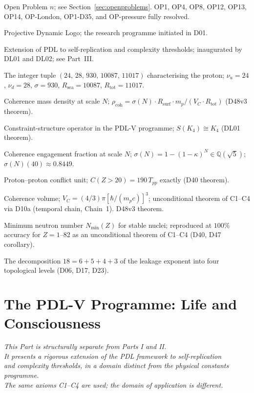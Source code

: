 \documentclass[11pt,a4paper]{article}
\theoremstyle{plain}
\theoremstyle{definition}
\theoremstyle{remark}
\newcommand{\quintuplet}{(24,\,28,\,930,\,10087,\,11017)}
\newcommand{\Rsurf}{R_{\mathrm{surf}}}
\newcommand{\Rtot}{R_{\mathrm{tot}}}
\newcommand{\sigmaN}{\sigma(N)}
\newcommand{\Tpp}{T_{pp}}
\newcommand{\rhocoh}{\rho_{\mathrm{coh}}}
\begin{document}
\begin{description}[leftmargin=3.5cm, style=nextline]
\item[OP$n$] Open Problem $n$; see Section~\ref{sec:openproblems}. OP1, OP4, OP8, OP12, OP13, OP14, OP-London, OP1-D35, and OP-pressure fully resolved.
\item[PDL] Projective Dynamic Logo; the research programme initiated in D01.
\item[PDL-V programme] Extension of PDL to self-replication and complexity thresholds; inaugurated by DL01 and DL02; see Part~III.
\item[Quintuplet] The integer tuple $\quintuplet$ characterising the proton; $\nu_u=24$, $\nu_d=28$, $\sigma=930$, $R_{\mathrm{sea}}=10087$, $R_{\mathrm{tot}}=11017$.
\item[$\rhocoh(N)$] Coherence mass density at scale $N$; $\rhocoh = \sigmaN\cdot\Rsurf\cdot m_p/(V_C\cdot\Rtot)$ (D48v3 theorem).
\item[$S(\Gamma)$] Constraint-structure operator in the PDL-V programme; $S(K_4) \cong K_4$ (DL01 theorem).
\item[$\sigmaN(N)$] Coherence engagement fraction at scale $N$; $\sigmaN=1-(1-\kappa)^N\in\mathbb{Q}(\sqrt{5})$; $\sigmaN(40)\approx 0.8449$.
\item[$\Tpp$] Proton--proton conflict unit; $C(Z>20)=190\,\Tpp$ exactly (D40 theorem).
\item[$V_C$] Coherence volume; $V_C=(4/3)\pi[\hbar/(m_pc)]^3$; unconditional theorem of C1--C4 via D10a (temporal chain, Chain~1). D48v3 theorem.
\item[Valley of stability] Minimum neutron number $N_{\min}(Z)$ for stable nuclei; reproduced at $100\%$ accuracy for $Z=1$--82 as an unconditional theorem of C1--C4 (D40, D47 corollary).
\item[18-filter hierarchy] The decomposition $18=6+5+4+3$ of the leakage exponent into four topological levels (D06, D17, D23).
\end{description}

\newpage
\part{The PDL-V Programme: Life and Consciousness}
\label{part:PDL-V}

\begin{center}
\textit{This Part is structurally separate from Parts I and II.\\
It presents a rigorous extension of the PDL framework to self-replication\\
and complexity thresholds, in a domain distinct from the physical constants programme.\\
The same axioms C1--C4 are used; the domain of application is different.}
\end{center}
\end{document}
